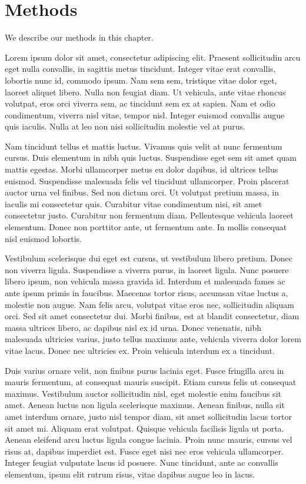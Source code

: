 \documentclass[
  12pt,
  a4paper,
]{book}
\begin{document}
\hypertarget{methods}{%
\chapter{Methods}\label{methods}}

We describe our methods in this chapter.

Lorem ipsum dolor sit amet, consectetur adipiscing elit. Praesent sollicitudin arcu eget nulla convallis, in sagittis metus tincidunt. Integer vitae erat convallis, lobortis nunc id, commodo ipsum. Nam sem sem, tristique vitae dolor eget, laoreet aliquet libero. Nulla non feugiat diam. Ut vehicula, ante vitae rhoncus volutpat, eros orci viverra sem, ac tincidunt sem ex at sapien. Nam et odio condimentum, viverra nisl vitae, tempor nisl. Integer euismod convallis augue quis iaculis. Nulla at leo non nisi sollicitudin molestie vel at purus.

Nam tincidunt tellus et mattis luctus. Vivamus quis velit at nunc fermentum cursus. Duis elementum in nibh quis luctus. Suspendisse eget sem sit amet quam mattis egestas. Morbi ullamcorper metus eu dolor dapibus, id ultrices tellus euismod. Suspendisse malesuada felis vel tincidunt ullamcorper. Proin placerat auctor urna vel finibus. Sed non dictum orci. Ut volutpat pretium massa, in iaculis mi consectetur quis. Curabitur vitae condimentum nisi, sit amet consectetur justo. Curabitur non fermentum diam. Pellentesque vehicula laoreet elementum. Donec non porttitor ante, ut fermentum ante. In mollis consequat nisl euismod lobortis.

Vestibulum scelerisque dui eget est cursus, ut vestibulum libero pretium. Donec non viverra ligula. Suspendisse a viverra purus, in laoreet ligula. Nunc posuere libero ipsum, non vehicula massa gravida id. Interdum et malesuada fames ac ante ipsum primis in faucibus. Maecenas tortor risus, accumsan vitae luctus a, molestie non augue. Nam felis arcu, volutpat vitae eros nec, sollicitudin aliquam orci. Sed sit amet consectetur dui. Morbi finibus, est at blandit consectetur, diam massa ultrices libero, ac dapibus nisl ex id urna. Donec venenatis, nibh malesuada ultricies varius, justo tellus maximus ante, vehicula viverra dolor lorem vitae lacus. Donec nec ultricies ex. Proin vehicula interdum ex a tincidunt.

Duis varius ornare velit, non finibus purus lacinia eget. Fusce fringilla arcu in mauris fermentum, at consequat mauris suscipit. Etiam cursus felis ut consequat maximus. Vestibulum auctor sollicitudin nisl, eget molestie enim faucibus sit amet. Aenean luctus non ligula scelerisque maximus. Aenean finibus, nulla sit amet interdum ornare, justo nisl tempor diam, sit amet sollicitudin lacus tortor sit amet mi. Aliquam erat volutpat. Quisque vehicula facilisis ligula ut porta. Aenean eleifend arcu luctus ligula congue lacinia. Proin nunc mauris, cursus vel risus at, dapibus imperdiet est. Fusce eget nisi nec eros vehicula ullamcorper. Integer feugiat vulputate lacus id posuere. Nunc tincidunt, ante ac convallis elementum, ipsum elit rutrum risus, vitae dapibus augue leo in lacus.
\end{document}
